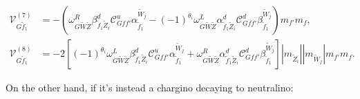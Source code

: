 \documentclass[final,3p,times]{elsarticle}
\begin{document}
\begin{align}
\mathcal{V}_{G \tilde{f}_1}^{(7)} &= -(\omega_{G \tilde{W} \tilde{Z}}^R \beta_{\tilde{f}_1 \tilde{Z}_i}^{d} \mathcal{C}_{G f f'}^u \alpha_{\tilde{f}_1}^{\tilde{W}_j} - (-1)^{\theta_i}\omega_{G \tilde{W} \tilde{Z}}^L \alpha_{\tilde{f}_1 \tilde{Z}_i}^{d} \mathcal{C}_{G f f'}^d \beta_{\tilde{f}_1}^{\tilde{W}_j})m_{f'}m_{f}, \\
\mathcal{V}_{G \tilde{f}_1}^{(8)} &= -2[(-1)^{\theta_i}\omega_{G \tilde{W} \tilde{Z}}^L \beta_{\tilde{f}_1 \tilde{Z}_i}^{d} \mathcal{C}_{G f f'}^u \alpha_{\tilde{f}_1}^{\tilde{W}_j} + \omega_{G \tilde{W} \tilde{Z}}^R \alpha_{\tilde{f}_1 \tilde{Z}_i}^{d} \mathcal{C}_{G f f'}^d \beta_{\tilde{f}_1}^{\tilde{W}_j}]|m_{\tilde{Z}_i}||m_{\tilde{W}_j}|m_{f'}m_{f}.
\end{align}

On the other hand, if it's instead a chargino decaying to neutralino:
\end{document}
